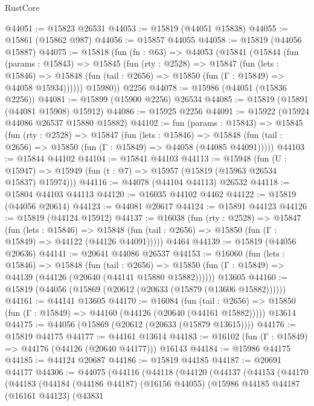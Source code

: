 \begin{lexlean}{RustCore}
\begin{coremodule}
@44051 := @15823 @26531
@44053 := @15819 (@44051 @15838)
@44055 := @15861 (@15862 @987)
@44056 := @15857 @44055
@44058 := @15819 (@44056 @15887)
@44075 := @15818
    (fun (fn : @63) =>
    @44053
      (@15841
        (@15844
          (fun (params : @15843) =>
          @15845
            (fun (rty : @2528) =>
            @15847
              (fun (lets : @15846) =>
              @15848 (fun (tail : @2656) => @15850 (fun (Γ : @15849) => @44058 @15934))))))
        @15980))
    @2256
@44078 := @15986 (@44051 (@15836 @2256))
@44081 := @15899 (@15900 @2256) @26534
@44085 := @15819 (@15891 (@44081 @15908) @15912)
@44086 := @15925 @2256
@44091 := @15922 (@15924 @44086 @26537 @15880 @15882)
@44102 := fun (params : @15843) =>
  @15845
    (fun (rty : @2528) =>
    @15847
      (fun (lets : @15846) =>
      @15848 (fun (tail : @2656) => @15850 (fun (Γ : @15849) => @44058 (@44085 @44091)))))
@44103 := @15844 @44102
@44104 := @15841 @44103
@44113 := @15948
    (fun (U : @15947) => @15949 (fun (t : @7) => @15957 (@15819 (@15963 @26534 @15837) @15974)))
@44116 := @44078 (@44104 @44113) @26532
@44118 := @15804 @44103 @44113
@44120 := @16035 @44102 @4462
@44122 := @15819 (@44056 @20614)
@44123 := @44081 @20617
@44124 := @15891 @44123
@44126 := @15819 (@44124 @15912)
@44137 := @16038
    (fun (rty : @2528) =>
    @15847
      (fun (lets : @15846) =>
      @15848 (fun (tail : @2656) => @15850 (fun (Γ : @15849) => @44122 (@44126 @44091)))))
    @4464
@44139 := @15819 (@44056 @20636)
@44141 := @20641 @44086 @26537
@44153 := @16060
    (fun (lets : @15846) =>
    @15848
      (fun (tail : @2656) =>
      @15850 (fun (Γ : @15849) => @44139 (@44126 (@20640 (@44141 @15880 @15882))))))
    @13605
@44160 := @15819 (@44056 (@15869 (@20612 (@20633 (@15879 (@13606 @15882))))))
@44161 := @44141 @13605
@44170 := @16084
    (fun (tail : @2656) => @15850 (fun (Γ : @15849) => @44160 (@44126 (@20640 (@44161 @15882)))))
    @13614
@44175 := @44056 (@15869 (@20612 (@20633 (@15879 @13615))))
@44176 := @15819 @44175
@44177 := @44161 @13614
@44183 := @16102 (fun (Γ : @15849) => @44176 (@44126 (@20640 @44177))) @16143
@44184 := @15986 @44175
@44185 := @44124 @20687
@44186 := @15819 @44185
@44187 := @20691 @44177
@44306 := @44075
    (@44116
      (@44118
        (@44120
          (@44137
            (@44153
              (@44170
                (@44183
                  (@44184
                    (@44186 @44187)
                    (@16156 @44055)
                    (@15986
                      @44185
                      @44187
                      (@16161 @44123)
                      (@43831

\end{coremodule}
\end{lexlean}
